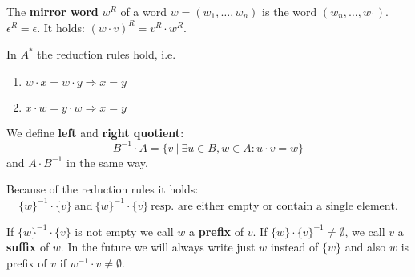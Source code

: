The {\bf mirror word} $w^R$ of a word $w = (w_1,\ldots,w_n)$ is the word
$(w_n,\ldots,w_1)$. $\epsilon^R = \epsilon$. It holds: $(w \cdot v)^R =
v^R \cdot w^R$.

In $A^*$ the reduction rules hold, i.e.
\begin{enumerate}
  \item $w \cdot x = w \cdot y \Rightarrow x = y$
  \item $x \cdot w = y \cdot w \Rightarrow x = y$
\end{enumerate}

We define {\bf left} and {\bf right quotient}:
\[ B^{-1} \cdot A = \{ v\ |\ \exists u \in B, w \in A : u \cdot v = w \} \]
and $A \cdot B^{-1}$ in the same way.

Because of the reduction rules it holds:
\[ \{w\}^{-1} \cdot \{v\}\ \mbox{and}\ \{w\}^{-1} \cdot \{v\}\ \mbox{resp. are
either empty or contain a single element.} \]

If $\{w\}^{-1} \cdot \{v\}$ is not empty we call $w$ a {\bf prefix} of $v$. If
$\{w\} \cdot \{v\}^{-1} \not= \emptyset $, we call $v$ a {\bf suffix} of $w$. In
the future we will always write just $w$ instead of $\{w\}$ and also $w$ is
prefix of $v$ if $w^{-1} \cdot v \not= \emptyset$.


